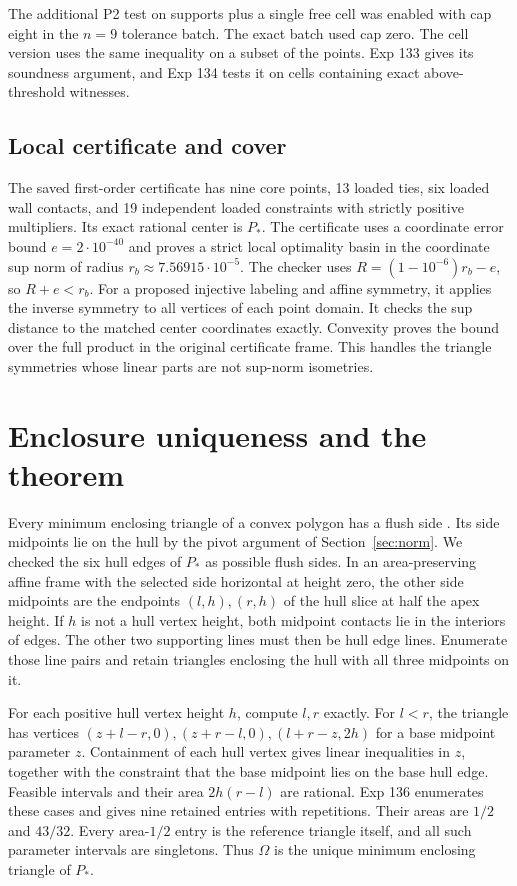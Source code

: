 \documentclass[11pt]{amsart}
\newcommand{\Om}{\Omega}
\begin{document}
The additional P2 test on supports plus a single free cell was enabled with cap eight in the \(n=9\) tolerance batch. The exact batch used cap zero. The cell version uses the same inequality on a subset of the points. Exp 133 gives its soundness argument, and Exp 134 tests it on cells containing exact above-threshold witnesses.

\subsection{Local certificate and cover}
The saved first-order certificate has nine core points, 13 loaded ties, six loaded wall contacts, and 19 independent loaded constraints with strictly positive multipliers. Its exact rational center is \(P_*\). The certificate uses a coordinate error bound \(e=2\cdot10^{-40}\) and proves a strict local optimality basin in the coordinate sup norm of radius \(r_b\approx7.56915\cdot10^{-5}\). The checker uses \(R=(1-10^{-6})r_b-e\), so \(R+e<r_b\). For a proposed injective labeling and affine symmetry, it applies the inverse symmetry to all vertices of each point domain. It checks the sup distance to the matched center coordinates exactly. Convexity proves the bound over the full product in the original certificate frame. This handles the triangle symmetries whose linear parts are not sup-norm isometries.

\section{Enclosure uniqueness and the theorem}
Every minimum enclosing triangle of a convex polygon has a flush side \cite{OR}. Its side midpoints lie on the hull by the pivot argument of Section~\ref{sec:norm}. We checked the six hull edges of \(P_*\) as possible flush sides. In an area-preserving affine frame with the selected side horizontal at height zero, the other side midpoints are the endpoints \((l,h),(r,h)\) of the hull slice at half the apex height. If \(h\) is not a hull vertex height, both midpoint contacts lie in the interiors of edges. The other two supporting lines must then be hull edge lines. Enumerate those line pairs and retain triangles enclosing the hull with all three midpoints on it.

For each positive hull vertex height \(h\), compute \(l,r\) exactly. For \(l<r\), the triangle has vertices \((z+l-r,0),(z+r-l,0),(l+r-z,2h)\) for a base midpoint parameter \(z\). Containment of each hull vertex gives linear inequalities in \(z\), together with the constraint that the base midpoint lies on the base hull edge. Feasible intervals and their area \(2h(r-l)\) are rational. Exp 136 enumerates these cases and gives nine retained entries with repetitions. Their areas are \(1/2\) and \(43/32\). Every area-\(1/2\) entry is the reference triangle itself, and all such parameter intervals are singletons. Thus \(\Om\) is the unique minimum enclosing triangle of \(P_*\).
\end{document}
